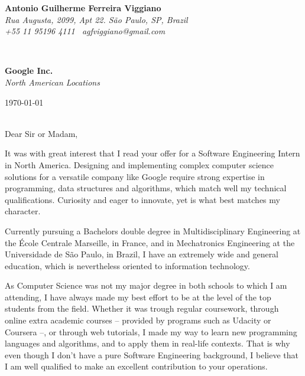 \documentclass[11pt]{article}
\begin{document}
\sffamily %
\hfill%
\begin{minipage}[t]{.6\textwidth}
\raggedleft%
{\bfseries Antonio Guilherme Ferreira Viggiano}\\[.35ex]
\small
\emph{Rua Augusta, 2099, Apt 22. São Paulo, SP, Brazil \\
+55 11 95196 4111 \textemdash~agfviggiano@gmail.com}
\end{minipage}\\[1em]
%
\begin{minipage}[t]{.4\textwidth}
\raggedright%
{\bfseries Google Inc.}\\[.35ex]
\small\itshape%
North American Locations
\end{minipage}
\hfill %
\begin{minipage}[t]{.4\textwidth}
\raggedleft %
\today
\end{minipage}\\[2em]
Dear Sir or Madam,\vspace{1.5em}
% 



It was with great interest that I read your offer for a Software Engineering Intern in North America. Designing and implementing complex computer science solutions for a versatile company like Google require strong expertise in programming, data structures and algorithms, which match well my technical qualifications. Curiosity and eager to innovate, yet is what best matches my character. \vspace{0.75em}

Currently pursuing a Bachelors double degree in Multidisciplinary Engineering at the École Centrale Marseille, in France, and in Mechatronics Engineering at the Universidade de São Paulo, in Brazil, I have an extremely wide and general education, which is nevertheless oriented to information technology. \vspace{0.75em}

As Computer Science was not my major degree in both schools to which I am attending, I have always made my best effort to be at the level of the top students from the field. Whether it was trough regular coursework, through online extra academic courses -- provided by programs such as Udacity or Coursera --, or through web tutorials, I made my way to learn new programming languages and algorithms, and to apply them in real-life contexts. That is why even though I don't have a pure Software Engineering background, I believe that I am well qualified to make an excellent contribution to your operations. \vspace{0.75em}
\end{document}
